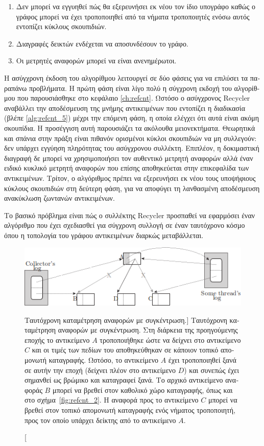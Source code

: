 \begin{greek}
\begin{enumerate}
\item Δεν μπορεί να εγγυηθεί πώς θα εξερευνήσει εκ νέου τον
  ίδιο υπογράφο καθώς ο γράφος μπορεί να έχει τροποποιηθεί
  από τα νήματα τροποποιητές ενόσω αυτός εντοπίζει κύκλους
  σκουπιδιών.
\item Διαγραφές δεικτών ενδέχεται να αποσυνδέσουν το γράφο.
\item Οι μετρητές αναφορών μπορεί να είναι ανενημέρωτοι.
\end{enumerate}

Η ασύγχρονη έκδοση του αλγορίθμου λειτουργεί σε δύο φάσεις
για να επιλύσει τα παραπάνω προβλήματα. Η πρώτη φάση είναι
λίγο πολύ η σύγχρονη εκδοχή του αλγορίθμου που παρουσιάσθηκε
στο κεφάλαιο \ref{ch:refcnt}. Ωστόσο ο ασύγχρονος Recycler
αναβάλλει την αποδέσμευση της μνήμης αντικειμένων που
εντοπίζει η διαδικασία \textenglish{} (βλέπε
\ref{alg:refcnt_5}) μέχρι την επόμενη φάση, η οποία ελέγχει
ότι αυτά είναι ακόμη σκουπίδια. Η προσέγγιση αυτή παρουσιάζει
τα ακόλουθα μειονεκτήματα. Θεωρητικά και σπάνια στην πράξη
είναι πιθανόν ορισμένοι κύκλοι σκουπιδιών να μη συλλεγούν:
δεν υπάρχει εγγύηση πληρότητας του ασύγχρονου συλλέκτη.
Επιπλέον, η δοκιμαστική διαγραφή δε μπορεί να χρησιμοποιήσει
τον αυθεντικό μετρητή αναφορών αλλά έναν ειδικό κυκλικό
μετρητή αναφορών που επίσης αποθηκεύεται στην επικεφαλίδα
των αντικειμένων. Τρίτον, ο αλγόριθμος πρέπει να εξερευνήσει
εκ νέου τους υποψήφιους κύκλους σκουπιδιών στη δεύτερη φάση,
για να αποφύγει τη λανθασμένη αποδέσμευση ανακύκλωση ζωντανών
αντικειμένων.

Το βασικό πρόβλημα είναι πώς ο συλλέκτης Recycler προσπαθεί
να εφαρμόσει έναν αλγόριθμο που έχει σχεδιασθεί για σύγχρονη
συλλογή σε έναν ταυτόχρονο κόσμο όπου η τοπολογία του γράφου
αντικειμένων διαρκώς μεταβάλλεται.

\begin{figure}
  \centering
  \includegraphics{figures/conc_4}
  \caption
    [Ταυτόχρονη καταμέτρηση αναφορών με συγκέντρωση.]
    {Ταυτόχρονη καταμέτρηση αναφορών με συγκέντρωση. Στη
     διάρκεια της προηγούμενης εποχής το αντικείμενο $A$
     τροποποιήθηκε ώστε να δείχνει στο αντικείμενο $C$
     και οι τιμές των πεδίων του αποθηκεύθηκαν σε κάποιον
     τοπικό απομονωτή καταγραφής. Ωστόσο, το αντικείμενο
     $A$ έχει τροποποιηθεί ξανά σε αυτήν την εποχή (δείχνει
     πλέον στο αντικείμενο $D$) και συνεπώς έχει σημανθεί
     ως βρώμικο και καταγραφεί ξανά. Το αρχικό αντικείμενο
     αναφοράς $B$ μπορεί να βρεθεί στον καθολικό χώρο
     καταγραφής, όπως και στο σχήμα~\ref{fig:refcnt_2}. Η
     αναφορά προς το αντικείμενο $C$ μπορεί να βρεθεί στον
     τοπικό απομονωτή καταγραφής ενός νήματος τροποποιητή,
     προς τον οποίο υπάρχει δείκτης από το αντικείμενο
     $A$.} 
\end{figure}


\end{greek}
